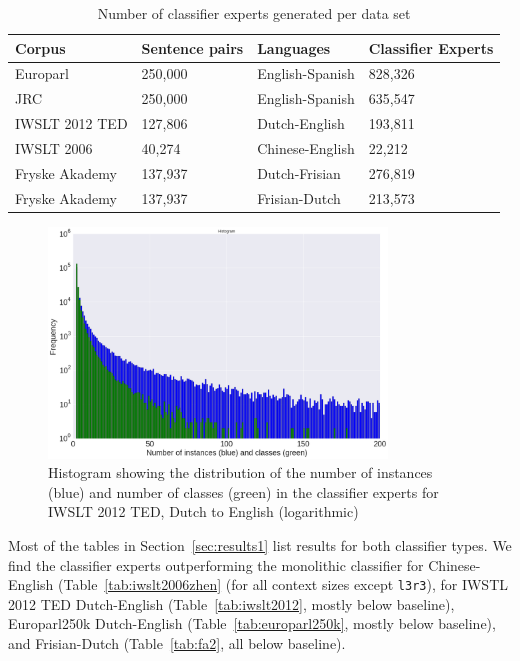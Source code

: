 \documentclass[smallextended]{svjour3}       %
\theoremstyle{break}
\begin{document}
\begin{table}
\begin{center}
\begin{tabular}{|lll|l|}
\hline
\textbf{Corpus} & \textbf{Sentence pairs} & \textbf{Languages} & \textbf{Classifier Experts} \\
\hline
Europarl & 250,000 & English-Spanish & 828,326 \\
JRC & 250,000 & English-Spanish & 635,547 \\
IWSLT 2012 TED & 127,806 & Dutch-English & 193,811 \\
IWSLT 2006 & 40,274 & Chinese-English & 22,212 \\
Fryske Akademy & 137,937 & Dutch-Frisian & 276,819 \\
Fryske Akademy & 137,937 & Frisian-Dutch & 213,573 \\
\hline
\end{tabular}
\caption{Number of classifier experts generated per data set}
\label{tab:expertcount}
\end{center}
\end{table}


\begin{figure}
\begin{center}
\includegraphics[width=90.00mm]{classifierhistogram.png}
\caption{Histogram showing the distribution of the number of instances (blue) and number of classes (green) in the classifier experts for IWSLT 2012 TED, Dutch to English (logarithmic)}
\label{fig:histogram}
\end{center}
\end{figure}

Most of the tables in Section~\ref{sec:results1} list results for both classifier
types.  We find the classifier experts outperforming the monolithic classifier
for Chinese-English (Table~\ref{tab:iwslt2006zhen} (for all context sizes except
\texttt{l3r3}), for  IWSTL 2012 TED Dutch-English (Table~\ref{tab:iwslt2012},
mostly below baseline), Europarl250k Dutch-English
(Table~\ref{tab:europarl250k}, mostly below baseline), and Frisian-Dutch
(Table~\ref{tab:fa2}, all below baseline).
\end{document}
